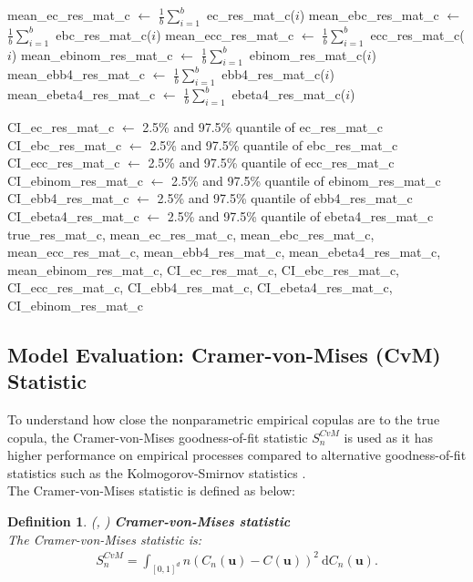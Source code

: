 \documentclass[12pt]{report}
\newtheorem{definition}{Definition}[subsection]
\newcommand{\1}{\mathbf{1}}
\begin{document}
\begin{flushleft}
\begin{algorithm}[H]
\begin{algorithmic}
    \EndFor
    \State mean\_ec\_res\_mat\_c $\gets$ $\frac{1}{b}\sum\limits_{i = 1}^{b}$ ec\_res\_mat\_c($i$)
    \State mean\_ebc\_res\_mat\_c $\gets$ $\frac{1}{b}\sum\limits_{i = 1}^{b}$ ebc\_res\_mat\_c($i$)
    \State mean\_ecc\_res\_mat\_c $\gets$ $\frac{1}{b}\sum\limits_{i = 1}^{b}$ ecc\_res\_mat\_c($i$)
    \State mean\_ebinom\_res\_mat\_c $\gets$ $\frac{1}{b}\sum\limits_{i = 1}^{b}$ ebinom\_res\_mat\_c($i$)
    \State mean\_ebb4\_res\_mat\_c $\gets$ $\frac{1}{b}\sum\limits_{i = 1}^{b}$ ebb4\_res\_mat\_c($i$)
    \State mean\_ebeta4\_res\_mat\_c $\gets$ $\frac{1}{b}\sum\limits_{i = 1}^{b}$ ebeta4\_res\_mat\_c($i$)

    \State CI\_ec\_res\_mat\_c $\gets$ 2.5\% and 97.5\% quantile of ec\_res\_mat\_c
    \State CI\_ebc\_res\_mat\_c $\gets$ 2.5\% and 97.5\% quantile of ebc\_res\_mat\_c
    \State CI\_ecc\_res\_mat\_c $\gets$ 2.5\% and 97.5\% quantile of ecc\_res\_mat\_c
    \State CI\_ebinom\_res\_mat\_c $\gets$ 2.5\% and 97.5\% quantile of ebinom\_res\_mat\_c
    \State CI\_ebb4\_res\_mat\_c $\gets$ 2.5\% and 97.5\% quantile of ebb4\_res\_mat\_c
    \State CI\_ebeta4\_res\_mat\_c $\gets$ 2.5\% and 97.5\% quantile of ebeta4\_res\_mat\_c
    \State \Return true\_res\_mat\_c, mean\_ec\_res\_mat\_c, mean\_ebc\_res\_mat\_c, mean\_ecc\_res\_mat\_c, mean\_ebb4\_res\_mat\_c, mean\_ebeta4\_res\_mat\_c, mean\_ebinom\_res\_mat\_c, CI\_ec\_res\_mat\_c, CI\_ebc\_res\_mat\_c, CI\_ecc\_res\_mat\_c, CI\_ebb4\_res\_mat\_c, CI\_ebeta4\_res\_mat\_c, CI\_ebinom\_res\_mat\_c
\EndProcedure
\end{algorithmic}
\end{algorithm}

\subsection{Model Evaluation: Cramer-von-Mises (CvM) Statistic}
\vspace{0.5cm}
To understand how close the nonparametric empirical copulas are to the true copula, the Cramer-von-Mises goodness-of-fit statistic $S_{n}^{CvM}$ is used as it has higher performance on empirical processes compared to alternative goodness-of-fit statistics such as the Kolmogorov-Smirnov statistics \parencite{GenestRemillardBeaudoinGOF2009}.\\
\vspace{0.5cm}
The Cramer-von-Mises statistic is defined as below:

\begin{definition}\label{CvMStatistics}
\textit{\normalfont(\cite{HofertBook}, \cite{GenestRemillardBeaudoinGOF2009})}\:
\textbf{Cramer-von-Mises statistic} \\
The Cramer-von-Mises statistic is:
\begin{align*}
S_{n}^{CvM} = \int_{[0,1]^d} n(C_{n}(\textbf{u}) - C(\textbf{u}))^{2} \: \mathrm{d}C_{n}(\textbf{u}).
\end{align*}
\end{definition}


\end{flushleft}
\end{document}
